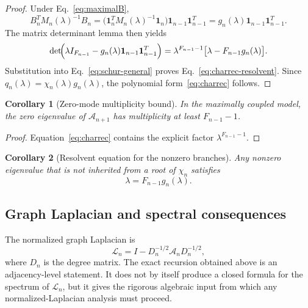 \documentclass[
  aps,
  prd,
  reprint,
  superscriptaddress,
  nofootinbib,
  longbibliography,
  amsmath,
  amssymb
]{revtex4-2}
\newtheorem{corollary}{Corollary}
\theoremstyle{remark}
\newcommand{\ones}{\mathbf{1}}
\begin{document}
\begin{proof}
Under Eq.~\eqref{eq:maximalB},
\begin{equation}
B_n^T M_n(\lambda)^{-1}B_n
=
\bigl(\ones_n^T M_n(\lambda)^{-1}\ones_n\bigr)
\ones_{n-1}\ones_{n-1}^{T}
=
 g_n(\lambda)\ones_{n-1}\ones_{n-1}^{T}.
\end{equation}
The matrix determinant lemma then yields
\begin{equation}
\det\!\Bigl(\lambda I_{F_{n-1}}-g_n(\lambda)\ones_{n-1}\ones_{n-1}^{T}\Bigr)
=
\lambda^{F_{n-1}-1}
\bigl[\lambda-F_{n-1}g_n(\lambda)\bigr].
\end{equation}
Substitution into Eq.~\eqref{eq:schur-general} proves Eq.~\eqref{eq:charrec-resolvent}. Since $q_n(\lambda)=\chi_n(\lambda)g_n(\lambda)$, the polynomial form~\eqref{eq:charrec} follows.
\end{proof}

\begin{corollary}[Zero-mode multiplicity bound]
\label{cor:zero}
In the maximally coupled model, the zero eigenvalue of $\mathcal A_{n+1}$ has multiplicity at least $F_{n-1}-1$.
\end{corollary}

\begin{proof}
Equation~\eqref{eq:charrec} contains the explicit factor $\lambda^{F_{n-1}-1}$.
\end{proof}

\begin{corollary}[Resolvent equation for the nonzero branches]
\label{cor:resolvent}
Any nonzero eigenvalue that is not inherited from a root of $\chi_n$ satisfies
\begin{equation}
\lambda = F_{n-1}g_n(\lambda).
\label{eq:eigcond}
\end{equation}
\end{corollary}

\subsection{Graph Laplacian and spectral consequences}

The normalized graph Laplacian is
\begin{equation}
\mathcal L_n = I-D_n^{-1/2}\mathcal A_nD_n^{-1/2},
\label{eq:laplacian}
\end{equation}
where $D_n$ is the degree matrix. The exact recursion obtained above is an adjacency-level statement. It does not by itself produce a closed formula for the spectrum of $\mathcal L_n$, but it gives the rigorous algebraic input from which any normalized-Laplacian analysis must proceed.
\end{document}
